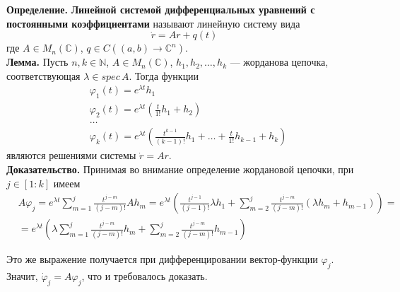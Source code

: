 \textbf{Определение.} \textbf{Линейной системой дифференциальных уравнений с постоянными коэффициентами} называют линейную систему вида
\begin{equation}
    \dot{r} = Ar + q(t) \label{linpost}
\end{equation}
где $A \in M_n(\mathbb{C})$, $q \in C((a,b) \to \mathbb{C}^n)$.\\

\noindent \textbf{Лемма.} Пусть $n, k \in \mathbb{N}$, $A \in M_n(\mathbb{C})$, $h_1, h_2, \ldots, h_k$ --- жорданова цепочка, соответствующая $\lambda \in spec\, A$. Тогда функции
\begin{equation*}
    \begin{aligned}
        &\varphi_1(t) = e^{\lambda t}h_1\\
        &\varphi_2(t) = e^{\lambda t}\left(\frac{t}{1!}h_1 + h_2\right)\\
        &\ldots\\
        &\varphi_k(t) = e^{\lambda t}\left(\frac{t^{k-1}}{(k-1)!}h_1 + \ldots + \frac{t}{1!}h_{k-1} + h_k\right)
    \end{aligned}
\end{equation*}
являются решениями системы $\dot{r} = Ar$.\\

\noindent \textbf{Доказательство.} Принимая во внимание определение жордановой цепочки, при $j \in [1 : k]$ имеем
\begin{equation*}
    \begin{aligned}
        &A\varphi_j = e^{\lambda t}\sum_{m=1}^j \frac{t^{j-m}}{(j-m)!}Ah_m = e^{\lambda t} \left(\frac{t^{j-1}}{(j-1)!}\lambda h_1 + \sum_{m=2}^j \frac{t^{j-m}}{(j-m)!}(\lambda h_m + h_{m - 1}) \right) = \\
        &= e^{\lambda t}\left(\lambda \sum_{m=1}^j \frac{t^{j - m}}{(j - m)!}h_m + \sum_{m = 2}^j \frac{t^{j-m}}{(j - m)!}h_{m-1} \right)
    \end{aligned}
\end{equation*}

Это же выражение получается при дифференцировании вектор-функции $\varphi_j$. Значит, $\dot{\varphi}_j = A\varphi_j$, что и требовалось доказать.\\

